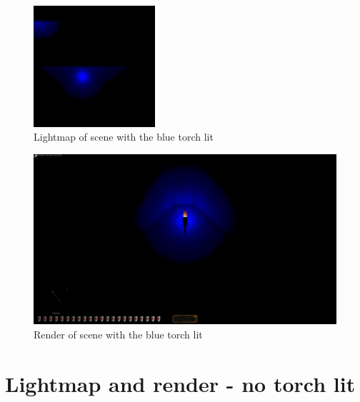 \begin{appendix}
\begin{figure}[htbp]
	\centering
		\includegraphics[width=0.40\textwidth]{img/PIX/b.png}
	\caption[Lightmap of scene with the blue torch lit]{Lightmap of scene with the blue torch lit}
	\label{fig:LightmapB}
\end{figure}
\begin{figure}[htbp]
	\centering
		\includegraphics[width=1.00\textwidth]{img/PIX/render_b.png}
	\caption[Render of scene with the blue torch lit]{Render of scene with the blue torch lit}
	\label{fig:RenderB}
\end{figure}

\clearpage
{}
\section{Lightmap and render - no torch lit} 


\end{appendix}
